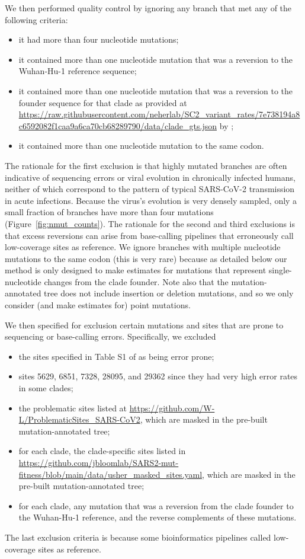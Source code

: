 \documentclass[9pt,twocolumn,twoside]{gsajnl_modified}
\begin{document}
{We then performed quality control by ignoring any branch that met any of the following criteria:
\begin{itemize}
\item it had more than four nucleotide mutations;
\item it contained more than one nucleotide mutation that was a reversion to the Wuhan-Hu-1 reference sequence;
\item it contained more than one nucleotide mutation that was a reversion to the founder sequence for that clade as provided at \url{https://raw.githubusercontent.com/neherlab/SC2_variant_rates/7e738194a8c6592082f1caa9a6ca70cb68289790/data/clade_gts.json} by \cite{neher2022contributions};
\item it contained more than one nucleotide mutation to the same codon.
\end{itemize}
The rationale for the first exclusion is that highly mutated branches are often indicative of sequencing errors or viral evolution in chronically infected humans, neither of which correspond to the pattern of typical SARS-CoV-2 transmission in acute infections.
Because the virus's evolution is very densely sampled, only a small fraction of branches have more than four mutations (Figure~\ref{fig:nmut_counts}).
The rationale for the second and third exclusions is that excess reversions can arise from base-calling pipelines that erroneously call low-coverage sites as reference.
We ignore branches with multiple nucleotide mutations to the same codon (this is very rare) because as detailed below our method is only designed to make estimates for mutations that represent single-nucleotide changes from the clade founder.
Note also that the mutation-annotated tree does not include insertion or deletion mutations, and so we only consider (and make estimates for) point mutations.

We then specified for exclusion certain mutations and sites that are prone to sequencing or base-calling errors.
Specifically, we excluded
\begin{itemize}
\item the sites specified in Table S1 of \cite{turakhia2020stability} as being error prone;
\item sites 5629, 6851, 7328, 28095, and 29362 since they had very high error rates in some clades;
\item the problematic sites listed at \url{https://github.com/W-L/ProblematicSites_SARS-CoV2}, which are masked in the pre-built mutation-annotated tree;
\item for each clade, the clade-specific sites listed in \url{https://github.com/jbloomlab/SARS2-mut-fitness/blob/main/data/usher_masked_sites.yaml}, which are masked in the pre-built mutation-annotated tree;
\item for each clade, any mutation that was a reversion from the clade founder to the Wuhan-Hu-1 reference, and the reverse complements of these mutations.
\end{itemize}
The last exclusion criteria is because some bioinformatics pipelines called low-coverage sites as reference.

}
\end{document}
